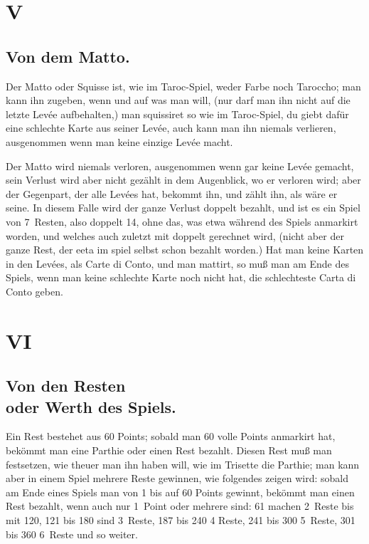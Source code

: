 \documentclass[11pt,a6paper,twoside]{article}
\begin{document}
\section{V}
\subsection{Von dem Matto.}

Der Matto oder Squisse ist, wie im Taroc-Spiel, weder Farbe noch Taroccho; man kann ihn zugeben, wenn und auf was man will, (nur darf man ihn nicht auf die letzte Levée aufbehalten,) man squissiret so wie im Taroc-Spiel, du giebt dafür eine schlechte Karte aus seiner Levée, auch kann man ihn niemals verlieren, ausgenommen wenn man keine einzige Levée macht.

Der Matto wird niemals verloren, ausgenommen wenn gar keine Levée gemacht, sein Verlust wird aber nicht gezählt in dem Augenblick, wo er verloren wird; aber der Gegenpart, der alle Levées hat, bekommt ihn, und zählt ihn, als wäre er seine. In diesem Falle wird der ganze Verlust doppelt bezahlt, und ist es ein Spiel von 7~Resten, also doppelt 14, ohne das, was etwa während des Spiels anmarkirt worden, und welches auch zuletzt mit doppelt gerechnet wird, (nicht aber der ganze Rest, der eeta im spiel selbst schon bezahlt worden.) Hat man keine Karten in den Levées, als Carte di Conto, und man mattirt, so muß man am Ende des Spiels, wenn man keine schlechte Karte noch nicht hat, die schlechteste Carta di Conto geben.

\section{VI}
\subsection{Von den Resten \\oder Werth des Spiels.}

Ein Rest bestehet aus 60 Points; sobald man 60 volle Points anmarkirt hat, bekömmt man eine Parthie oder einen Rest bezahlt. Diesen Rest muß man festsetzen, wie theuer man ihn haben will, wie im Trisette die Parthie; man kann aber in einem Spiel mehrere Reste gewinnen, wie folgendes zeigen wird: sobald am Ende eines Spiels man von 1 bis auf 60 Points gewinnt, bekömmt man einen Rest bezahlt, wenn auch nur 1~Point oder mehrere sind: 61 machen 2~Reste bis mit 120, 121 bis 180 sind 3~Reste, 187 bis 240 4 Reste, 241 bis 300 5~Reste, 301 bis 360 6~Reste und so weiter.
\end{document}
